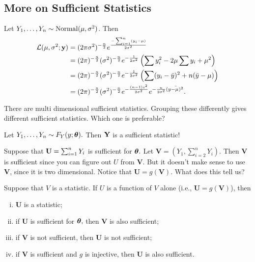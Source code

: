 
\subsection{More on Sufficient Statistics}

\begin{eg}
Let $Y_1,\ldots,Y_n\sim \operatorname*{Normal}(\mu,\sigma^2)$. Then
\begin{align*}
    \mathcal L(\mu,\sigma^2;\mathbf y)&=(2\pi\sigma^2)^{-\frac{n}{2}}e^{\frac{-\sum^n_{i=1}(y_i-\mu)}{2\sigma^2}} \\
    &=(2\pi)^{-\frac{n}{2}}(\sigma^2)^{-\frac{n}{2}}e^{-\frac{1}{2\sigma^2}}\left(\sum y_i^2-2\mu\sum y_i +\mu^2\right) \\
    &=(2\pi)^{-\frac{n}{2}}(\sigma^2)^{-\frac{n}{2}}e^{-\frac{1}{2\sigma^2}}\left(\sum (y_i-\bar y)^2+n(\bar y -\mu) \right) \\
	&=(2\pi)^{-\frac{n}{2}}(\sigma^2)^{-\frac{n}{2}}e^{-\frac{(n-1)s^2}{2\sigma^2}}e^{-\frac{n}{2\sigma^2}(\bar{ y-\mu)^2}}.
\end{align*}
\end{eg}

There are multi dimensional sufficient statistics. Grouping these differently gives different sufficient statistics. Which one is preferable?

Let $Y_1,\ldots,Y_n\sim F_Y(y;{\boldsymbol{\theta}}).$ Then $\mathbf Y$ is a sufficient statistic! 

Suppose that $\mathbf U=\sum^n_{i=1}Y_i$ is sufficient for ${\boldsymbol{\theta}}.$ Let $\mathbf V=\left(Y_1,\sum^n_{i=2}Y_i\right)$. Then $\mathbf V$ is sufficient since you can figure out $U$ from $\mathbf V.$ But it doesn't make sense to use $\mathbf V$, since it is two dimensional. Notice that $\mathbf  U=g(\mathbf V).$ What does this tell us?

\begin{prop}
Suppose that $V$ is a statistic. If $U$ is a function of $V$ alone (i.e., $\mathbf U=g(\mathbf V)$), then
\begin{enumerate}[i.]
    \item $\mathbf U$ is a statistic;
    \item if $\mathbf U$ is sufficient for ${\boldsymbol{\theta}},$ then $\mathbf V$ is also sufficient;
    \item if $\mathbf V$ is not sufficient, then $\mathbf U$ is not sufficient;
    \item if $\mathbf V$ is sufficient and $g$ is injective, then $\mathbf U$ is also sufficient.
\end{enumerate}
\end{prop}

